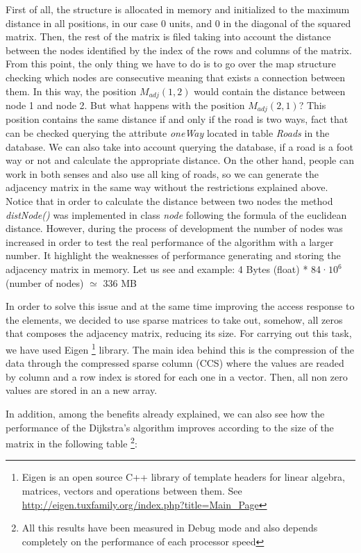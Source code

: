 \documentclass{article}
\begin{document}
First of all, the structure is allocated in memory and initialized to the maximum distance in all positions, in our case 0 units, and 0 in the diagonal of the squared matrix. Then, the rest of the matrix is filed taking into account the distance between the nodes identified by the index of the rows and columns of the matrix. From this point, the only thing we have to do is to go over the map structure checking which nodes are consecutive meaning that exists a connection between them. In this way, the position $M_{adj}(1,2)$ would contain the distance between node 1 and node 2. But what happens with the position $M_{adj}(2,1)$? This position contains the same distance if and only if the road is two ways, fact that can be checked querying the attribute \textit{oneWay} located in table \textit{Roads} in the database. 
We can also take into account querying the database, if a road is a foot way or not and calculate the appropriate distance.
On the other hand, people can work in both senses and also use all king of roads, so we can generate the adjacency matrix in the same way without the restrictions explained above. Notice that in order to calculate the distance between two nodes the method \textit{distNode()} was implemented in class \textit{node } following the formula of the euclidean distance. 
However, during the process of development the number of nodes was increased in order to test the real performance of the algorithm with a larger number. It highlight the weaknesses of performance generating and storing the adjacency matrix in memory. Let us see and example: 4 Bytes (float) * 84·$10^{6}$ (number of nodes) $\simeq$ 336 MB

In order to solve this issue and at the same time improving the access response to the elements, we decided to use sparse matrices to take out, somehow, all zeros that composes the adjacency matrix, reducing its size. For carrying out this task, we have used Eigen \footnote{Eigen is an open source C++ library of template headers for linear algebra, matrices, vectors and operations between them. See \url{ http://eigen.tuxfamily.org/index.php?title=Main_Page}} library. The main idea behind this is the compression of the data through the compressed sparse column (CCS) where the values are readed by column and a row index is stored for each one in a vector. Then, all non zero values are stored in an a new array. 

In addition, among the benefits already explained, we can also see how the performance of the Dijkstra's algorithm improves according to the size of the matrix in the following table \footnote{All this results have been measured in Debug mode and also depends completely on the performance of each processor speed}:
\end{document}
